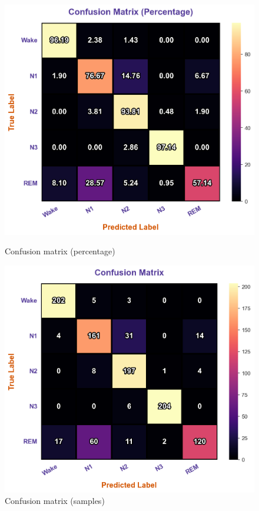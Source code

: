 \begin{figure}[htbp]
	\centering
	\begin{minipage}[b]{0.45\linewidth}
		\includegraphics[width=\linewidth]{img/paper_3/confusion matrix percentatge wise}
		\caption{Confusion matrix (percentage)}
		\label{fig:confusion-matrix-percentatge-wise}
	\end{minipage}
	\hfill
	\begin{minipage}[b]{0.45\linewidth}
		\includegraphics[width=\linewidth]{img/paper_3/confusion matrix samples}
		\caption{Confusion matrix (samples)}
		\label{fig:confusion-matrix-samples}
	\end{minipage}
\end{figure}

